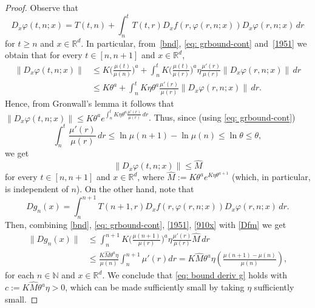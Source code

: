 \documentclass[10pt,a4paper]{amsart}
\def\N{\mathbb{N}}
\def\R{\mathbb{R}}
\renewcommand{\phi}{\varphi}
\begin{document}
\begin{proof}
 Observe that 
\begin{equation}\label{dphi}
D_x\phi(t, n; x)=T(t,n)+\int_n^t T(t,r)D_xf(r, \phi(r, n;x))D_x\phi(r, n;x)\, dr
\end{equation}
for $t\ge n$ and $x\in \R^d$.  In particular, from~\eqref{bnd}, \eqref{eq: grbound-cont} and~\eqref{1951} we obtain that for every $t\in [n, n+1]$ and $x\in \R^d$,
\[
\begin{split}
\lVert D_x\phi(t, n; x) \rVert&\le K\bigg (\frac{\mu (t)}{\mu (n)} \bigg )^a  + \int_n^t K \bigg (\frac{\mu(t)}{\mu(r)} \bigg )^a \eta \frac{\mu'(r)}{\mu(r)} \lVert D_x\phi(r, n;x)\rVert\, dr
\\
&\le K\theta^a  +\int_n^t K\eta  \theta^a  \frac{\mu'(r)}{\mu(r)} \lVert D_x\phi(r, n;x)\rVert\, dr.
\end{split}
\]
 Hence, from Gronwall's lemma it follows that 
$\lVert D_x\phi(t, n; x) \rVert \le K \theta^a  e^{\int_n^t K\eta  \theta^a  \frac{\mu'(r)}{\mu(r)}\, dr}$. Thus, since (using \eqref{eq: grbound-cont})
\begin{equation}\label{eq: aux int mu' mu}
\int_n^t   \frac{\mu'(r)}{\mu(r)}\, dr\leq  \ln \mu (n+1)-\ln \mu(n)\leq \ln \theta\leq  \theta,
\end{equation}
we get 
\begin{equation}\label{910x}
\lVert D_x\phi(t, n; x) \rVert \le \hat M 
\end{equation}
for every $t\in [n, n+1]$ and $x\in \R^d$, where $\hat M:=K\theta^ae^{K\eta \theta^{a+1} }$ (which, in particular, is independent of $n$).
On the other hand, note that
\begin{equation}\label{Dfm}
Dg_n(x)=\int_n^{n+1}T(n+1, r)D_xf(r, \phi(r, n;x))D_x\phi(r, n;x)\, dr.
\end{equation}
Then, combining \eqref{bnd}, \eqref{eq: grbound-cont}, \eqref{1951}, \eqref{910x} with \eqref{Dfm} we get
\[
\begin{split}
\lVert Dg_n(x) \rVert &\le \int_n^{n+1}K \bigg (\frac{\mu(n+1)}{\mu(r)} \bigg )^a  \eta \frac{\mu'(r)}{\mu(r)} \hat M  \, dr \\
&\le \frac{K\hat M \theta^{a}\eta }{\mu(n)} \int_n^{n+1}\mu'(r)dr =K\hat M \theta^{a}\eta \left( \frac{\mu(n+1)-\mu(n)}{\mu(n)} \right),
\end{split}
\]
for each $n\in \N$ and $x\in \R^d$. We conclude that \eqref{eq: bound deriv g} holds with $c:=K\hat M\theta^{a}\eta >0$, which can be made sufficiently small by taking $\eta$ sufficiently small. 


\end{proof}
\end{document}
